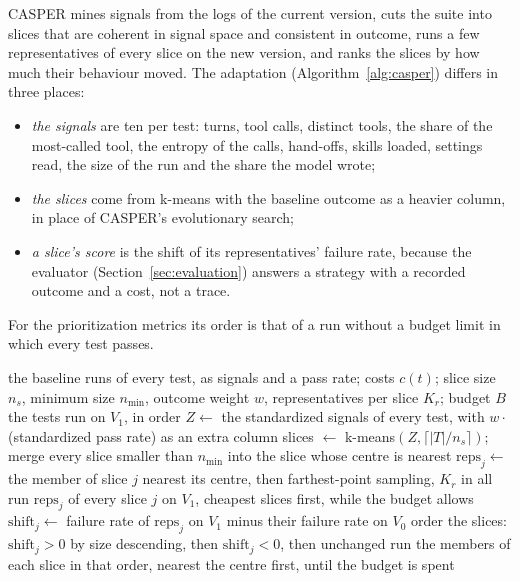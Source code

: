 \documentclass[11pt,a4paper]{article}
\newcommand{\strat}[1]{\texttt{#1}}
\begin{document}
CASPER \cite{muse2026casper} mines signals from the logs of the current version, cuts the suite into slices that
are coherent in signal space and consistent in outcome, runs a few representatives of every slice on the new
version, and ranks the slices by how much their behaviour moved. The adaptation (Algorithm~\ref{alg:casper})
differs in three places:
\begin{itemize}
  \item \emph{the signals} are ten per test: turns, tool calls, distinct tools, the share of the most-called tool,
        the entropy of the calls, hand-offs, skills loaded, settings read, the size of the run and the share the
        model wrote;
  \item \emph{the slices} come from k-means \cite{lloyd1982least} with the baseline outcome as a heavier column,
        in place of CASPER's evolutionary search;
  \item \emph{a slice's score} is the shift of its representatives' failure rate, because the evaluator
        (Section~\ref{sec:evaluation}) answers a strategy with a recorded outcome and a cost, not a trace.
\end{itemize}
For the prioritization metrics its order is that of a run without a budget limit in which every test passes.

\begin{algorithm}[!htbp]
\caption{\strat{casper\_slices}}
\label{alg:casper}
\begin{algorithmic}[1]
\Require the baseline runs of every test, as signals and a pass rate; costs $c(t)$; slice size $n_s$, minimum
  size $n_{\min}$, outcome weight $w$, representatives per slice $K_r$; budget $B$
\Ensure the tests run on $V_1$, in order
\State $Z \gets$ the standardized signals of every test, with $w \cdot$ (standardized pass rate) as an extra column
\State slices $\gets$ k-means$(Z, \lceil |T| / n_s \rceil)$; merge every slice smaller than $n_{\min}$ into the
  slice whose centre is nearest
\State $\mathrm{reps}_j \gets$ the member of slice $j$ nearest its centre, then farthest-point sampling, $K_r$ in
  all
\State run $\mathrm{reps}_j$ of every slice $j$ on $V_1$, cheapest slices first, while the budget allows
\State $\mathrm{shift}_j \gets$ failure rate of $\mathrm{reps}_j$ on $V_1$ minus their failure rate on $V_0$
\State order the slices: $\mathrm{shift}_j > 0$ by size descending, then $\mathrm{shift}_j < 0$, then unchanged
\State run the members of each slice in that order, nearest the centre first, until the budget is spent
\end{algorithmic}
\end{algorithm}
\end{document}
